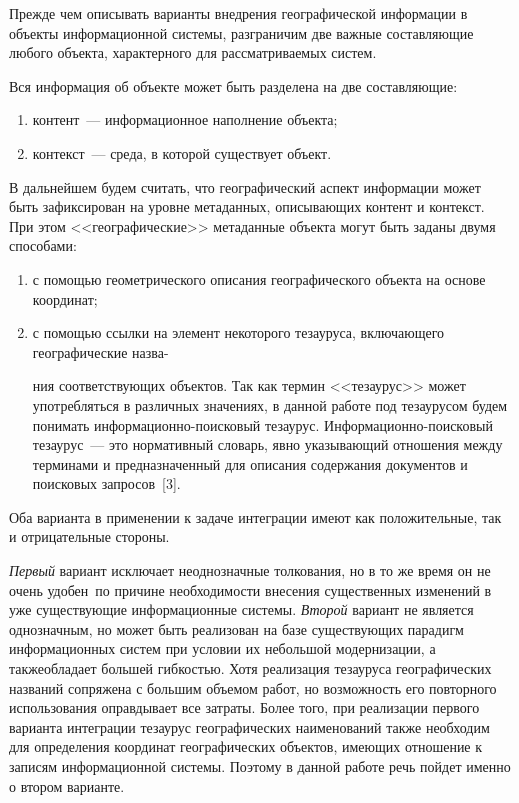 \begin{multicols}{2}
  \vspace*{-1pt}
  
  Прежде чем описывать варианты внедрения геогра\-фи\-че\-ской информации в объекты 
информационной системы, разграничим две важные со\-став\-ля\-ющие любого объекта, 
характерного для рас\-смат\-ри\-ва\-емых систем.
  
  Вся информация об объекте может быть разделена на две составляющие:
  \begin{enumerate}[(1)]
\item контент~--- информационное наполнение объекта;\\[-14pt]
\item контекст~--- среда, в которой существует объект.
\end{enumerate}

  В дальнейшем будем считать, что географический аспект информации может быть 
зафиксирован на уровне метаданных, описывающих контент и контекст. При этом 
<<географические>> метаданные объекта могут быть заданы двумя способами:
  \begin{enumerate}[(1)]
\item с помощью геометрического описания географического объекта на основе 
координат;\\[-14pt]
\item с помощью ссылки на элемент некоторого тезауруса, включающего географические 
назва-\linebreak\vspace*{-12pt}

\pagebreak

\noindent
ния соответствующих объектов. Так как термин <<тезаурус>> может употребляться в 
различных значениях, в данной работе под тезаурусом будем понимать 
ин\-фор\-ма\-ци\-он\-но-поиско\-вый тезаурус. Ин\-фор\-ма\-ци\-он\-но-поиско\-вый 
тезаурус~--- это нормативный словарь, явно указывающий отношения между терминами и 
предназначенный для описания содержания документов и поисковых запросов~[3].
  \end{enumerate}
  
  Оба варианта в применении к задаче интеграции имеют как положительные, так и 
отрицательные стороны.
  
  \textit{Первый} вариант исключает неоднозначные толкования, но в то же время он не 
очень удобен~по причине необходимости внесения существенных изменений в уже 
существующие информационные системы. \textit{Второй} вариант не является 
однозначным, но может быть реализован на базе существующих парадигм информационных 
систем при условии их небольшой модернизации, а также\linebreak облада\-ет большей гибкостью. 
Хотя реализация тезауруса географических названий сопряжена с большим объемом работ, 
но возможность его повторного использования оправдывает все затраты. Более того, при 
реализации первого варианта интеграции тезаурус географических наименований также 
необходим для определения координат географических объектов, имеющих отношение к 
записям информационной системы. Поэтому в данной работе речь пойдет именно о втором 
варианте.
  

\end{multicols}
